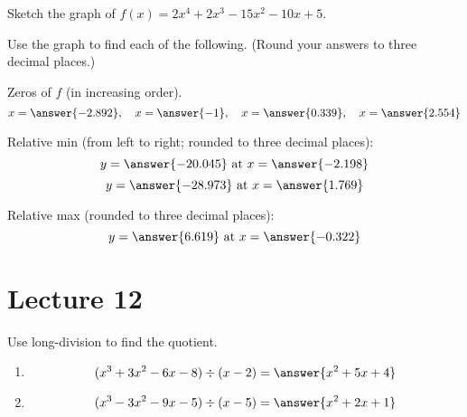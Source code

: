 \documentclass{ximera}
\begin{document}
  \begin{problem}\label{prob:160hom5prob6} 
  Sketch the graph of $f(x)=2x^4+2x^3-15x^2-10x+5$.
  \begin{center}  
\end{center}
  Use the graph to find each of the following.  (Round your answers to three decimal places.)
  
  Zeros of $f$ (in increasing order).
  $$x=\answer{-2.892},\quad x=\answer{-1},\quad x=\answer{0.339},\quad x=\answer{2.554}$$
  
  Relative min (from left to right; rounded to three decimal places):
  $$y=\answer{-20.045} \mbox{ at } x=\answer{-2.198}$$
  $$y=\answer{-28.973}\mbox{ at } x=\answer{1.769}$$
  
  Relative max (rounded to three decimal places):
  $$y=\answer{6.619}\mbox{ at } x=\answer{-0.322}$$
    \end{problem}
    
 \section{Lecture 12}   
\begin{problem}\label{prob:160hom5prob4} Use long-division to find the quotient.
\begin{enumerate}
  \item $$(x^3+3x^2-6x-8)\div (x-2)=\answer{x^2+5x+4}$$
  \item $$(x^3-3x^2-9x-5)\div (x-5)=\answer{x^2+2x+1}$$
  \end{enumerate}
  \end{problem}    
 
 
\end{document}
